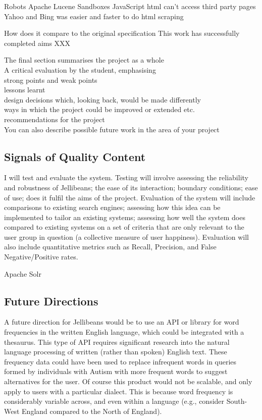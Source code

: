 \documentclass[a4paper, 11pt]{article}
\begin{document}
Robots
Apache Lucene
Sandboxes
JavaScript html can't access third party pages
Yahoo and Bing was easier and faster to do html scraping


How does it compare to the original specification
This work has successfully completed aims XXX

The final section summarises the project as a whole\\
A critical evaluation by the student, emphasising\\
strong points and weak points\\
lessons learnt\\
design decisions which, looking back, would be made differently\\
ways in which the project could be improved or extended etc.\\
recommendations for the project\\
You can also describe possible future work in the area of your project

\subsection{Signals of Quality Content}
I will test and evaluate the system. Testing will involve assessing the reliability and robustness of Jellibeans; the ease of its interaction; boundary conditions; ease of use; does it fulfil the aims of the project.
Evaluation of the system will include comparisons to existing search engines; assessing how this idea can be implemented to tailor an existing systems; assessing how well the system does compared to existing systems on a set of criteria that are only relevant to the user group in question (a collective measure of user happiness). Evaluation will also include quantitative metrics such as Recall, Precision, and False Negative/Positive rates.


Apache Solr\\


\subsection{Future Directions}
A future direction for Jellibeans would be to use an API or library for word frequencies in the written English language, which could be integrated with a thesaurus. This type of API requires significant research into the natural language processing of written (rather than spoken) English text. These frequency data could have been used to replace infrequent words in queries formed by individuals with Autism with more frequent words to suggest alternatives for the user. Of course this product would not be scalable, and only apply to users with a particular dialect. This is because word frequency is considerably variable across, and even within a language (e.g., consider South-West England compared to the North of England).
\end{document}

